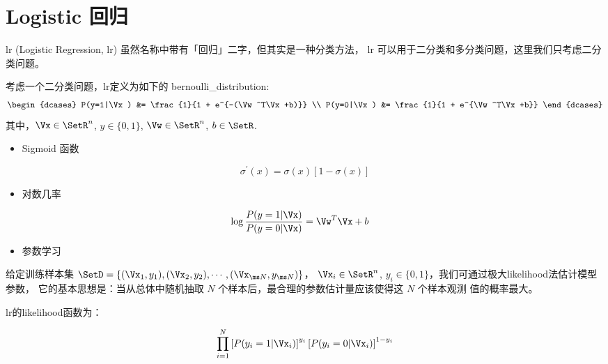 
\section{Logistic 回归}

\gls{lr} (Logistic Regression, lr) 虽然名称中带有「回归」二字，但其实是一种分类方法，
\gls{lr} 可以用于二分类和多分类问题，这里我们只考虑二分类问题。

考虑一个二分类问题，\gls{lr}定义为如下的 \gls{bernoulli_distribution}:
\begin{equation} \label{math:lr}
	\begin{dcases}
		P(y=1|\Vx) &= \frac{1}{1 + e^{-(\Vw^T\Vx+b)}} \\
		P(y=0|\Vx) &= \frac{1}{1 + e^{\Vw^T\Vx+b}} 
	\end{dcases}
\end{equation}
其中，$\Vx \in \SetR^n$, $y \in \{0, 1\}$, $\Vw \in \SetR^n$, $b \in \SetR$.



\begin{itemize}
  \item Sigmoid 函数
\end{itemize}

\begin{equation}
	\sigma^{'}(x) = \sigma(x)[1-\sigma(x)]
\end{equation}


\begin{itemize}
  \item 对数几率
\end{itemize}

\begin{align}
	\log \frac{P(y=1|\Vx)}{P(y=0|\Vx)} &= \Vw^T\Vx+b
	\label{logistic_prob}
\end{align}


\begin{itemize}
  \item 参数学习
\end{itemize}

给定训练样本集 $\SetD = \{(\Vx_1, y_1), (\Vx_2, y_2), \cdots, (\Vx_{\ms N}, y_{\ms N})\}$，
$\Vx_i \in \SetR^n$, $y_i \in \{0, 1\}$，我们可通过极大\gls{likelihood}法估计模型参数，
它的基本思想是：当从总体中随机抽取 $N$ 个样本后，最合理的参数估计量应该使得这 $N$ 个样本观测
值的概率最大。

\gls{lr}的\gls{likelihood}函数为：

\begin{equation}
	\prod_{i = 1}^N \left[
		P(y_i = 1 | \Vx_i)\right]^{y_i} \left[P(y_i = 0 | \Vx_i)
		\right]^{1 - y_i} 
\end{equation}

